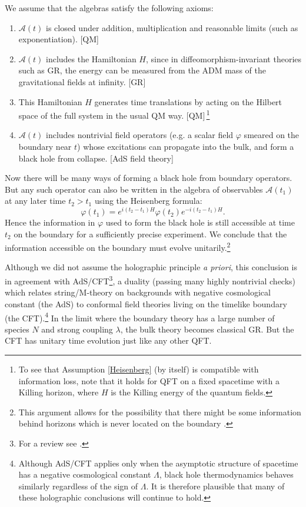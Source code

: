 \documentclass[12pt]{article}
\def\be{\begin{equation}}
\def\ee{\end{equation}}
\begin{document}
We assume that the algebras satisfy the following axioms:
\begin{enumerate}
\item  $\mathcal{A}(t)$ is closed under addition, multiplication and reasonable limits (such as exponentiation).  [QM]
\item
$\mathcal{A}(t)$ includes the Hamiltonian $H$, since in diffeomorphism-invariant theories such as GR, the energy can be measured from the ADM mass \cite{Arnowitt:1962hi} of the gravitational fields at infinity.  [GR]
\item
This Hamiltonian $H$ generates time translations by acting on the Hilbert space of the full system in the usual QM way. \label{Heisenberg} [QM]\,\footnote{To see that Assumption \ref{Heisenberg} (by itself) is compatible with information loss, note that it holds for QFT on a fixed spacetime with a Killing horizon, where $H$ is the Killing energy of the quantum fields.}
\item
$\mathcal{A}(t)$ includes nontrivial field operators (e.g. a scalar field $\varphi$ smeared on the boundary near $t$) whose excitations can propagate into the bulk, and form a black hole from collapse.  [AdS field theory]
\end{enumerate}
Now there will be many ways of forming a black hole from boundary operators. But any such operator can also be written in the algebra of observables $\mathcal{A}(t_1)$ at any later time $t_2 > t_1$ using the Heisenberg formula:
\be
\varphi(t_1) = e^{i(t_2 - t_1)H} \varphi(t_2) e^{-i(t_2 - t_1)H}.
\ee
Hence the information in $\varphi$ used to form the black hole is still accessible at time $t_2$ on the boundary for a sufficiently precise experiment.  We conclude that the information accessible on the boundary must evolve unitarily.\footnote{This argument allows for the possibility that there might be some information behind horizons which is never located on the boundary \cite{Marolf:2012xe}.}

Although we did not assume the holographic principle \emph{a priori}, this conclusion is in agreement with AdS/CFT\footnote{For a review see \cite{Hubeny:2014bla}.}, a duality (passing many highly nontrivial checks) which relates string/M-theory on backgrounds with negative cosmological constant (the AdS) to conformal field theories living on the timelike boundary (the CFT).\footnote{Although AdS/CFT applies only when the asymptotic structure of spacetime has a negative cosmological constant $\Lambda$, black hole thermodynamics behaves similarly regardless of the sign of $\Lambda$.  It is therefore plausible that many of these holographic conclusions will continue to hold.}  In the limit where the boundary theory has a large number of species $N$ and strong coupling $\lambda$, the bulk theory becomes classical GR.  But the CFT has unitary time evolution just like any other QFT.
\end{document}
